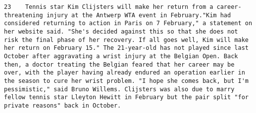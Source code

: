 \documentclass[11pt]{article}
\begin{document}
\begin{Verbatim}[commandchars=\\\{\}]
         23    Tennis star Kim Clijsters will make her return from a career-threatening injury at the Antwerp WTA event in February."Kim had considered returning to action in Paris on 7 February," a statement on her website said. "She's decided against this so that she does not risk the final phase of her recovery. If all goes well, Kim will make her return on February 15." The 21-year-old has not played since last October after aggravating a wrist injury at the Belgian Open. Back then, a doctor treating the Belgian feared that her career may be over, with the player having already endured an operation earlier in the season to cure her wrist problem. "I hope she comes back, but I'm pessimistic," said Bruno Willems. Clijsters was also due to marry fellow tennis star Lleyton Hewitt in February but the pair split "for private reasons" back in October.                                                                                                                                                                                                                                                                                                                                                                                                                                                                                                                                                                                                                                                                                                                                                                                                                                                                                                                                                                                                                                                                                                                                                                                                                                                                                                                                                                                                                                                                                                                                                                                                                                                                                                                                                                                                                                                                                                                                                                                                                                                                                                                                                                                                                                                                                                                                                                                                                                                                                                                                      
\end{Verbatim}
\end{document}
